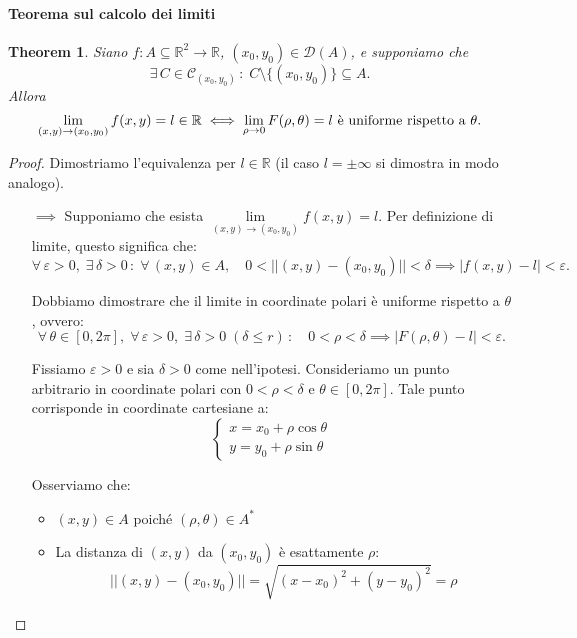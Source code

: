 \documentclass{article}
\theoremstyle{plain}
\newtheorem{thm}{Theorem}[section]
\theoremstyle{definition}
\theoremstyle{remark}
\begin{document}
\paragraph{Teorema sul calcolo dei limiti}
\begin{bxthm}
\begin{thm}
    Siano $f:A\subseteq\mathbb{R}^2\to\mathbb{R}$, $(x_0,y_0)\in\mathcal{D}(A)$, e supponiamo che
    \[\exists\,C\in\mathcal{C}_{(x_0,y_0)}\,:\;C\setminus\{(x_0,y_0)\}\subseteq A.\]
    Allora \[\lim_{(x,y)\to(x_0,y_0)}f(x,y)=l\in\mathbb{R}\iff \lim_{\rho\to0}F(\rho,\theta)=l\textup{ è uniforme rispetto a }\theta.\]
\end{thm}
\end{bxthm}
\begin{proof}
    Dimostriamo l'equivalenza per $l\in\mathbb{R}$ (il caso $l=\pm\infty$ si dimostra in modo analogo).

    \begin{itemize}
        \item[$\implies$] Supponiamo che esista $\lim\limits_{(x,y)\to(x_0,y_0)}f(x,y)=l$. Per definizione di limite, questo significa che:
        \[\forall\,\varepsilon>0,\;\exists\,\delta>0\,:\;\forall\,(x,y)\in A,\quad 0<||(x,y)-(x_0,y_0)||<\delta\implies|f(x,y)-l|<\varepsilon.\]
        
        Dobbiamo dimostrare che il limite in coordinate polari è uniforme rispetto a $\theta$, ovvero:
        \[\forall\,\theta\in[0,2\pi],\;\forall\,\varepsilon>0,\; \exists\,\delta>0\;(\delta\leq r)\,:\quad 0<\rho<\delta\implies |F(\rho,\theta)-l|<\varepsilon.\]
        
        Fissiamo $\varepsilon>0$ e sia $\delta>0$ come nell'ipotesi. Consideriamo un punto arbitrario in coordinate polari con $0<\rho<\delta$ e $\theta\in[0,2\pi]$.
        Tale punto corrisponde in coordinate cartesiane a:
        \[\begin{cases}
            x=x_0+\rho\cos\theta\\
            y=y_0+\rho\sin\theta    
        \end{cases}\]
        
        Osserviamo che:
        \begin{itemize}
            \item $(x,y)\in A$ poiché $(\rho,\theta)\in A^*$ 
            \item La distanza di $(x,y)$ da $(x_0,y_0)$ è esattamente $\rho$:
            \[||(x,y)-(x_0,y_0)||=\sqrt{(x-x_0)^2+(y-y_0)^2}=\rho\]
        \end{itemize}
        

\end{itemize}
\end{proof}
\end{document}
